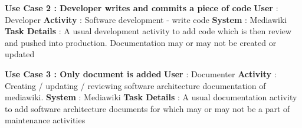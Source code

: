\begin{mdframed}[leftmargin=10pt,rightmargin=10pt]
\textbf{Use Case 2 : Developer writes and commits a piece of code}
\newline \newline \indent \textbf{User} : Developer
\newline \newline \indent \textbf{Activity} : Software development - write code
\newline \newline \indent \textbf{System} : Mediawiki
\newline \newline \indent \textbf{Task Details} : A usual development activity to add code which is then review and pushed into production. Documentation may or may not be created or updated
\end{mdframed}

\begin{mdframed}[leftmargin=10pt,rightmargin=10pt]
\textbf{Use Case 3 : Only document is added}
 \newline \newline \indent \textbf{User} : Documenter
 \newline \newline \indent \textbf{Activity} : Creating / updating / reviewing software architecture documentation of mediawiki.
 \newline \newline \indent \textbf{System} : Mediawiki
 \newline \newline \indent \textbf{Task Details} : A usual documentation activity to add software architecture documents for which may or may not be a part of maintenance activities
\end{mdframed}

